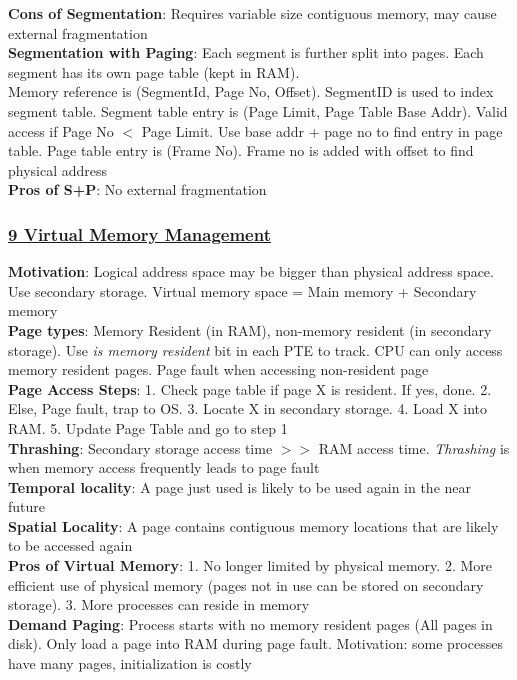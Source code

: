 \documentclass{article}
\begin{document}
{\begin{multicols*}{3}
\textbf{Cons of Segmentation}: Requires variable size contiguous memory, may cause external fragmentation \\
\textbf{Segmentation with Paging}: Each segment is further split into pages. Each segment has its own page table (kept in RAM).\\
Memory reference is (SegmentId, Page No, Offset). SegmentID is used to index segment table. Segment table entry is (Page Limit, Page Table Base Addr). Valid access if Page No $<$ Page Limit. Use base addr + page no to find entry in page table. Page table entry is (Frame No). Frame no is added with offset to find physical address\\ 
\textbf{Pros of S+P}: No external fragmentation
\subsubsection*{\underline{9 Virtual Memory Management}}
\textbf{Motivation}: Logical address space may be bigger than physical address space. Use secondary storage. Virtual memory space = Main memory + Secondary memory\\
\textbf{Page types}: Memory Resident (in RAM), non-memory resident (in secondary storage). Use \textit{is memory resident} bit in each PTE to track. CPU can only access memory resident pages. Page fault when accessing non-resident page\\
\textbf{Page Access Steps}: 1. Check page table if page X is resident. If yes, done. 2. Else, Page fault, trap to OS. 3. Locate X in secondary storage. 4. Load X into RAM. 5. Update Page Table and go to step 1 \\
\textbf{Thrashing}: Secondary storage access time $>>$ RAM access time. \textit{Thrashing} is when memory access frequently leads to page fault\\
\textbf{Temporal locality}: A page just used is likely to be used again in the near future\\
\textbf{Spatial Locality}: A page contains contiguous memory locations that are likely to be accessed again\\
\textbf{Pros of Virtual Memory}: 1. No longer limited by physical memory. 2. More efficient use of physical memory (pages not in use can be stored on secondary storage). 3. More processes can reside in memory\\
\textbf{Demand Paging}: Process starts with no memory resident pages (All pages in disk). Only load a page into RAM during page fault. Motivation: some processes have many pages, initialization is costly\\

\end{multicols*}}
\end{document}
